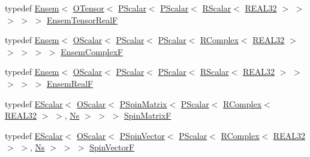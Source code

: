 \begin{DoxyCompactItemize}
\item 
typedef \mbox{\hyperlink{classENSEM_1_1Ensem}{Ensem}}$<$ \mbox{\hyperlink{classENSEM_1_1OTensor}{O\+Tensor}}$<$ \mbox{\hyperlink{classENSEM_1_1PScalar}{P\+Scalar}}$<$ \mbox{\hyperlink{classENSEM_1_1PScalar}{P\+Scalar}}$<$ \mbox{\hyperlink{classENSEM_1_1RScalar}{R\+Scalar}}$<$ \mbox{\hyperlink{namespaceENSEM_a7540d01191172323e9073283d772576d}{R\+E\+A\+L32}} $>$ $>$ $>$ $>$ $>$ \mbox{\hyperlink{group__defs_ga0da81ce50f4b2ae81c1190e8e266480c}{Ensem\+Tensor\+RealF}}
\item 
typedef \mbox{\hyperlink{classENSEM_1_1Ensem}{Ensem}}$<$ \mbox{\hyperlink{classENSEM_1_1OScalar}{O\+Scalar}}$<$ \mbox{\hyperlink{classENSEM_1_1PScalar}{P\+Scalar}}$<$ \mbox{\hyperlink{classENSEM_1_1PScalar}{P\+Scalar}}$<$ \mbox{\hyperlink{classENSEM_1_1RComplex}{R\+Complex}}$<$ \mbox{\hyperlink{namespaceENSEM_a7540d01191172323e9073283d772576d}{R\+E\+A\+L32}} $>$ $>$ $>$ $>$ $>$ \mbox{\hyperlink{group__defs_gaac62e751aea40f9e3423a058ca20c7c9}{Ensem\+ComplexF}}
\item 
typedef \mbox{\hyperlink{classENSEM_1_1Ensem}{Ensem}}$<$ \mbox{\hyperlink{classENSEM_1_1OScalar}{O\+Scalar}}$<$ \mbox{\hyperlink{classENSEM_1_1PScalar}{P\+Scalar}}$<$ \mbox{\hyperlink{classENSEM_1_1PScalar}{P\+Scalar}}$<$ \mbox{\hyperlink{classENSEM_1_1RScalar}{R\+Scalar}}$<$ \mbox{\hyperlink{namespaceENSEM_a7540d01191172323e9073283d772576d}{R\+E\+A\+L32}} $>$ $>$ $>$ $>$ $>$ \mbox{\hyperlink{group__defs_gab272a08b4cb02e4fae683911645bd3e1}{Ensem\+RealF}}
\item 
typedef \mbox{\hyperlink{classENSEM_1_1EScalar}{E\+Scalar}}$<$ \mbox{\hyperlink{classENSEM_1_1OScalar}{O\+Scalar}}$<$ \mbox{\hyperlink{classENSEM_1_1PSpinMatrix}{P\+Spin\+Matrix}}$<$ \mbox{\hyperlink{classENSEM_1_1PScalar}{P\+Scalar}}$<$ \mbox{\hyperlink{classENSEM_1_1RComplex}{R\+Complex}}$<$ \mbox{\hyperlink{namespaceENSEM_a7540d01191172323e9073283d772576d}{R\+E\+A\+L32}} $>$ $>$, \mbox{\hyperlink{namespaceENSEM_a6f05e048f9b2eb1a19131074f8abc25f}{Ns}} $>$ $>$ $>$ \mbox{\hyperlink{group__defs_ga9332913187b2b1a824c75f7c9cafd4d3}{Spin\+MatrixF}}
\item 
typedef \mbox{\hyperlink{classENSEM_1_1EScalar}{E\+Scalar}}$<$ \mbox{\hyperlink{classENSEM_1_1OScalar}{O\+Scalar}}$<$ \mbox{\hyperlink{classENSEM_1_1PSpinVector}{P\+Spin\+Vector}}$<$ \mbox{\hyperlink{classENSEM_1_1PScalar}{P\+Scalar}}$<$ \mbox{\hyperlink{classENSEM_1_1RComplex}{R\+Complex}}$<$ \mbox{\hyperlink{namespaceENSEM_a7540d01191172323e9073283d772576d}{R\+E\+A\+L32}} $>$ $>$, \mbox{\hyperlink{namespaceENSEM_a6f05e048f9b2eb1a19131074f8abc25f}{Ns}} $>$ $>$ $>$ \mbox{\hyperlink{group__defs_gac8b2551d6b9e8c0baa2f4261f966b28a}{Spin\+VectorF}}

\end{DoxyCompactItemize}
